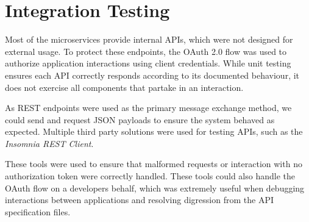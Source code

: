 \section{Integration Testing}
\par
Most of the microservices provide internal APIs, which were not designed for external usage. To protect these endpoints, the OAuth 2.0 flow was used to authorize application interactions using client credentials. While unit testing ensures each API correctly responds according to its documented behaviour, it does not exercise all components that partake in an interaction.

\par
As REST endpoints were used as the primary message exchange method, we could send and request JSON payloads to ensure the system behaved as expected. Multiple third party solutions were used for testing APIs, such as the \textit{Insomnia REST Client}\cite{insomnia}.

\par
These tools were used to ensure that malformed requests or interaction with no authorization token were correctly handled. These tools could also handle the OAuth flow on a developers behalf, which was extremely useful when debugging interactions between applications and resolving digression from the API specification files.
